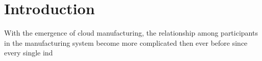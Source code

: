 \section{Introduction}
With the emergence of cloud manufacturing, the relationship among participants in the manufacturing system become more complicated then ever before since every single ind







